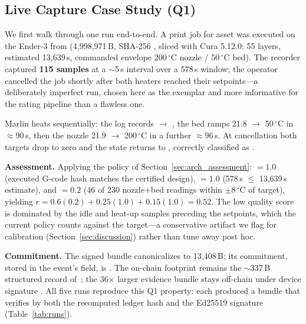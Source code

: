 \subsection{Live Capture Case Study (Q1)}
\label{sec:eval_capture}

We first walk through one run end-to-end.  A print job for asset
 was executed on the Ender-3 from 
(4{,}998{,}971\,B, SHA-256 , sliced with Cura 5.12.0:
55 layers, estimated 13{,}639\,s, commanded envelope 200\,$^{\circ}$C
nozzle / 50\,$^{\circ}$C bed).  The recorder captured \textbf{115 samples}
at a $\sim$5\,s interval over a 578\,s window; the operator cancelled the
job shortly after both heaters reached their setpoints---a deliberately
imperfect run, chosen here as the  exemplar and more
informative for the rating pipeline than a flawless one.

Marlin heats sequentially: the log records 
$\rightarrow$ , the bed ramps 21.8 $\rightarrow$
50\,$^{\circ}$C in ${\approx}90$\,s, then the nozzle 21.9 $\rightarrow$
200\,$^{\circ}$C in a further ${\approx}96$\,s.  At cancellation both
targets drop to zero and the state returns to ,
correctly classified as .

\textbf{Assessment.}  Applying the policy of
Section~\ref{sec:arch_assessment}:  $= 1.0$ (executed
G-code hash matches the certified design),  $= 1.0$
(578\,s $\leq$ 13{,}639\,s estimate), and  $= 0.2$
(46 of 230 nozzle+bed readings within $\pm 8\,^{\circ}$C of target),
yielding $r = 0.6(0.2) + 0.25(1.0) + 0.15(1.0) = \mathbf{0.52}$.  The low
quality score is dominated by the idle and heat-up samples preceding the
setpoints, which the current policy counts against the target---a
conservative artifact we flag for calibration
(Section~\ref{sec:discussion}) rather than tune away post hoc.

\textbf{Commitment.}  The signed bundle canonicalizes to 13{,}408\,B; its
commitment, stored in the  event's
 field, is
\allowbreak
{}.  The on-chain footprint remains
the $\sim$337\,B structured record of~\cite{anonymous2026unified}; the
36$\times$ larger evidence bundle stays off-chain under device signature
.  All five runs reproduce this Q1 property:
each produced a bundle that verifies by both the recomputed ledger hash
and the Ed25519 signature (Table~\ref{tab:runs}).

